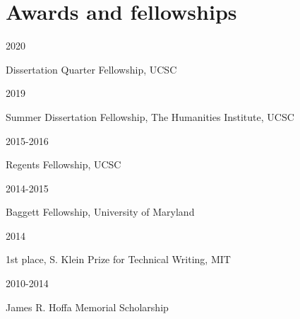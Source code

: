 \documentclass[12pt]{article} %
\begin{document}







\section{Awards and fellowships}

\begin{minipage}[t]{3cm}
	2020
\end{minipage}
\begin{minipage}[t]{\smallertextwidth}Dissertation Quarter Fellowship, UCSC\end{minipage}

\begin{minipage}[t]{3cm}
2019
\end{minipage}
\begin{minipage}[t]{\smallertextwidth}Summer Dissertation Fellowship, The Humanities Institute, UCSC\end{minipage}

\begin{minipage}[t]{3cm}
2015-2016
\end{minipage}
\begin{minipage}[t]{\smallertextwidth}Regents Fellowship, UCSC\end{minipage}

\begin{minipage}[t]{3cm}
2014-2015
\end{minipage}
\begin{minipage}[t]{\smallertextwidth}Baggett Fellowship, University of Maryland\end{minipage}

\begin{minipage}[t]{3cm}
2014
\end{minipage}
\begin{minipage}[t]{\smallertextwidth}1st place, S. Klein Prize for Technical Writing, MIT\end{minipage}

\begin{minipage}[t]{3cm}
2010-2014
\end{minipage}
\begin{minipage}[t]{\smallertextwidth}James R. Hoffa Memorial Scholarship\end{minipage}
\end{document}
